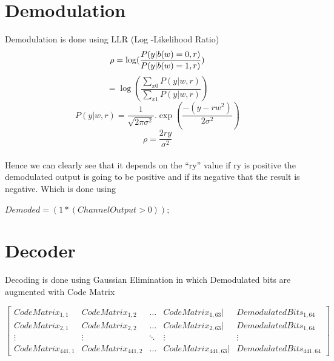 \documentclass[12pt,a4paper,onecolumn]{article}
\begin{document}
\section{Demodulation}
Demodulation is done using LLR (Log -Likelihood Ratio)
\begin{equation*}
\rho = \log(\frac{P(y|b(w)=0,r)}{P(y|b(w)=1,r)})
\\
\end{equation*}
\begin{equation*}
= \log(\frac{\sum_{x0} P(y|w,r)}{\sum_{x1} P(y|w,r)} )
\end{equation*}
\begin{equation*}
P(y|w,r) = \frac{1}{\sqrt{2\pi\sigma^2}}.\exp(\frac{-(y-rw^2)}{2\sigma^2})
\end{equation*}
\begin{equation*}
\rho = \frac{2ry}{\sigma^2}
\end{equation*}
\\
Hence we can clearly see that it depends on the “ry” value if ry is positive the demodulated output is going to be positive and if its negative that the result is negative.
Which is done using \\
\begin{center}
$Demoded = (1*(ChannelOutput > 0));$
\end{center}

\section{Decoder }
Decoding is done using Gaussian Elimination in which Demodulated bits are augmented with Code Matrix 

\begin{equation*}
\begin{bmatrix}
CodeMatrix_{1,1} & CodeMatrix_{1,2} & \ldots
& CodeMatrix_{1,63} \vert & DemodulatedBits_{1,64} \\
CodeMatrix_{2,1} & CodeMatrix_{2,2} & \ldots
& CodeMatrix_{2,63} \vert & DemodulatedBits_{1,64} \\
\vdots & \vdots & \ddots
& \vdots  & \vdots \\
CodeMatrix_{441,1} & CodeMatrix_{441,2} & \ldots & CodeMatrix_{441,63} \vert & DemodulatedBits_{441,64}
\end{bmatrix}
\end{equation*}
\end{document}
